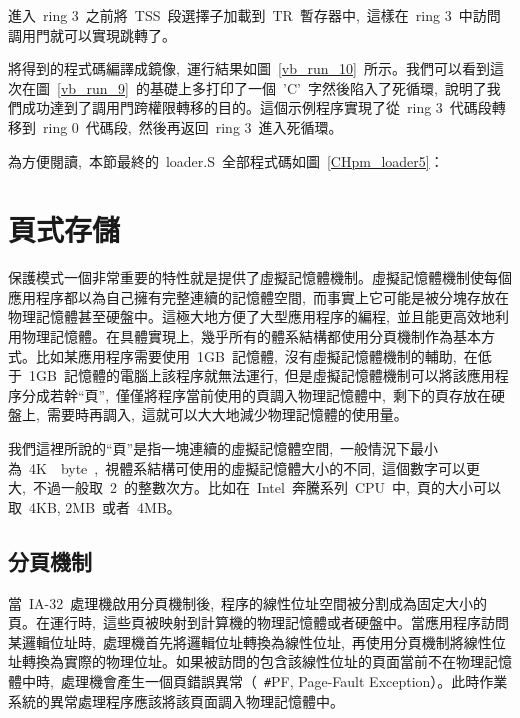 進入~ring 3~之前將~TSS~段選擇子加載到~TR~暫存器中,~這樣在~ring 3~中訪問調用門就可以實現跳轉了。

\label{CHpm_tss_load}

將得到的程式碼編譯成鏡像,~運行結果如圖~\ref{vb_run_10}~所示。我們可以看到這次在圖~\ref{vb_run_9}~的基礎上多打印了一個~'C'~字然後陷入了死循環,~說明了我們成功達到了調用門跨權限轉移的目的。這個示例程序實現了從~ring 3~代碼段轉移到~ring 0~代碼段,~然後再返回~ring 3~進入死循環。


為方便閱讀,~本節最終的~loader.S~全部程式碼如圖~\ref{CHpm_loader5}：

\label{CHpm_loader5}

\section{頁式存儲}

保護模式一個非常重要的特性就是提供了虛擬記憶體機制。虛擬記憶體機制使每個應用程序都以為自己擁有完整連續的記憶體空間,~而事實上它可能是被分塊存放在物理記憶體甚至硬盤中。這極大地方便了大型應用程序的編程,~並且能更高效地利用物理記憶體。在具體實現上,~幾乎所有的體系結構都使用分頁機制作為基本方式。比如某應用程序需要使用~1GB~記憶體,~沒有虛擬記憶體機制的輔助,~在低于~1GB~記憶體的電腦上該程序就無法運行,~但是虛擬記憶體機制可以將該應用程序分成若幹“頁”,~僅僅將程序當前使用的頁調入物理記憶體中,~剩下的頁存放在硬盤上,~需要時再調入,~這就可以大大地減少物理記憶體的使用量。

我們這裡所說的“頁”是指一塊連續的虛擬記憶體空間,~一般情況下最小為~4K~~byte~,~視體系結構可使用的虛擬記憶體大小的不同,~這個數字可以更大,~不過一般取~2~的整數次方。比如在~Intel~奔騰系列~CPU~中,~頁的大小可以取~4KB, 2MB~或者~4MB。

\subsection{分頁機制}

當~IA-32~處理機啟用分頁機制後,~程序的線性位址空間被分割成為固定大小的頁。在運行時,~這些頁被映射到計算機的物理記憶體或者硬盤中。當應用程序訪問某邏輯位址時,~處理機首先將邏輯位址轉換為線性位址,~再使用分頁機制將線性位址轉換為實際的物理位址。如果被訪問的包含該線性位址的頁面當前不在物理記憶體中時,~處理機會產生一個頁錯誤異常（~\texttt{\#}PF, Page-Fault Exception）。此時作業系統的異常處理程序應該將該頁面調入物理記憶體中。

